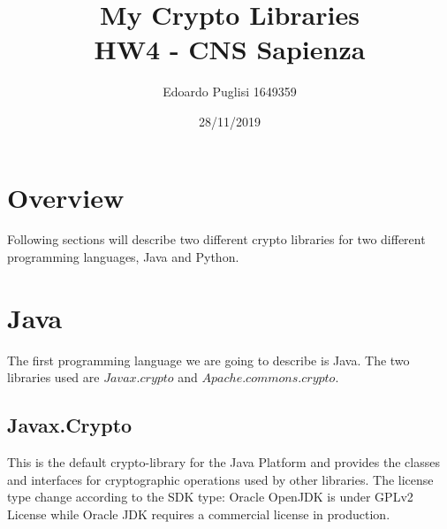 \documentclass[11pt,a4paper]{article}
\title{My Crypto Libraries \\ HW4 - CNS Sapienza}
\author{Edoardo Puglisi 1649359}
\date{28/11/2019}
\begin{document}
\lstset{breaklines=true}
	
\maketitle
\tableofcontents
\clearpage

\section{Overview}
Following sections will describe two different crypto libraries for two different programming languages, Java and Python.

\section{Java}
The first programming language we are going to describe is Java. The two libraries used are $Javax.crypto$ and $Apache.commons.crypto$.
\subsection{Javax.Crypto}
This is the default crypto-library for the Java Platform and provides the classes and interfaces for cryptographic operations used by other libraries.
The license type change according to the SDK type: Oracle OpenJDK is under GPLv2 License while Oracle JDK requires a commercial license in production.
\end{document}

